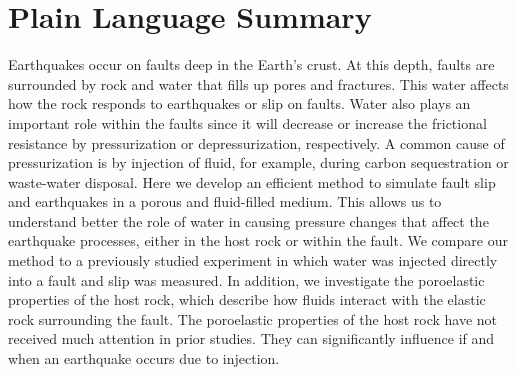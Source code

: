 \documentclass[draft]{agujournal2019}
\begin{document}
\section*{Plain Language Summary}
Earthquakes occur on faults deep in the Earth's crust. At this depth, faults are surrounded by rock and water that fills up pores and fractures. This water affects how the rock responds to earthquakes or slip on faults. Water also plays an important role within the faults since it will decrease or increase the frictional resistance by pressurization or depressurization, respectively. A common cause of pressurization is by injection of fluid, for example, during carbon sequestration or waste-water disposal. Here we develop an efficient method to simulate fault slip and earthquakes in a porous and fluid-filled medium. This allows us to understand better the role of water in causing pressure changes that affect the earthquake processes, either in the host rock or within the fault. We compare our method to a previously studied experiment in which water was injected directly into a fault and slip was measured. In addition, we investigate the poroelastic properties of the host rock, which describe how fluids interact with the elastic rock surrounding the fault. The poroelastic properties of the host rock have not received much attention in prior studies. They can significantly influence if and when an earthquake occurs due to injection.


%
%

% 
%


%
%
%
%
\end{document}
